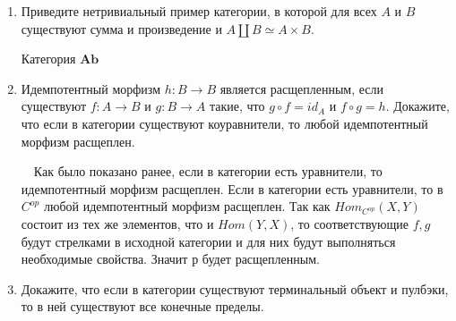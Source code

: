 \documentclass[draft]{article}
\newcommand{\cat}[1]{\mathbf{#1}}
\newcommand{\Ab}{\cat{Ab}}
\begin{document}
\begin{enumerate}
\item Приведите нетривиальный пример категории, в которой для всех $A$ и $B$ существуют сумма и произведение и $A \amalg B \simeq A \times B$.

Категория $\Ab$

\item Идемпотентный морфизм $h : B \to B$ является расщепленным, если существуют $f : A \to B$ и $g : B \to A$ такие, что $g \circ f = id_A$ и $f \circ g = h$.
Докажите, что если в категории существуют коуравнители, то любой идемпотентный морфизм расщеплен.

~~Как было показано ранее, если в категории есть уравнители, то идемпотентный морфизм расщеплен. Если в категории есть уравнители, то в 
$C^{op}$ любой идемпотентный морфизм расщеплен. Так как $Hom_{C^{op}}(X, Y)$ состоит из тех же элементов, что и $Hom(Y, X)$, то соответствующие $f, g$ будут стрелками в исходной категории и для них будут выполняться необходимые свойства. Значит $р$ будет расщепленным.

\item Докажите, что если в категории существуют терминальный объект и пулбэки, то в ней существуют все конечные пределы.


\end{enumerate}
\end{document}

